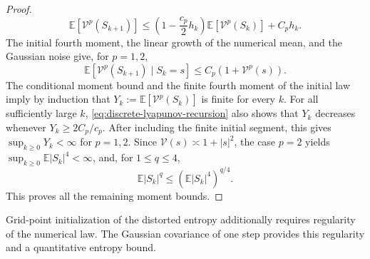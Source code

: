 \documentclass[11pt]{article}
\theoremstyle{definition}
\newcommand{\E}{\mathbb E}
\begin{document}
\begin{proof}
\begin{equation}
\E\left[\mathcal V^p(S_{k+1})\right]
 \leq\left(1-\frac{c_p}{2}h_k\right)\E\left[\mathcal V^p(S_k)\right]+C_ph_k.
\end{equation}
The initial fourth moment, the linear growth of the numerical mean, and the
Gaussian noise give, for $p=1,2$,
\[
 \E\left[\mathcal V^p(S_{k+1})\mid S_k=s\right]
 \leq C_p(1+\mathcal V^p(s)).
\]
The conditional moment bound and the finite fourth moment of the initial law
imply by induction that $Y_k:=\E[\mathcal V^p(S_k)]$ is finite for every $k$.
For all sufficiently large $k$, \eqref{eq:discrete-lyapunov-recursion}
also shows that $Y_k$ decreases whenever $Y_k\geq2C_p/c_p$.
After including the finite initial segment, this
gives $\sup_{k\geq0}Y_k<\infty$ for $p=1,2$.
Since
$\mathcal V(s)\asymp1+|s|^2$, the case $p=2$ yields
$\sup_{k\geq0}\E|S_k|^4<\infty$,
and, for $1\leq q\leq4$,
\[
 \E|S_k|^q\leq\left(\E|S_k|^4\right)^{q/4}.
\]
This proves all the remaining moment bounds.
\end{proof}

Grid-point initialization of the distorted entropy additionally requires
regularity of the numerical law. The Gaussian covariance of one step provides
this regularity and a quantitative entropy bound.
\end{document}
